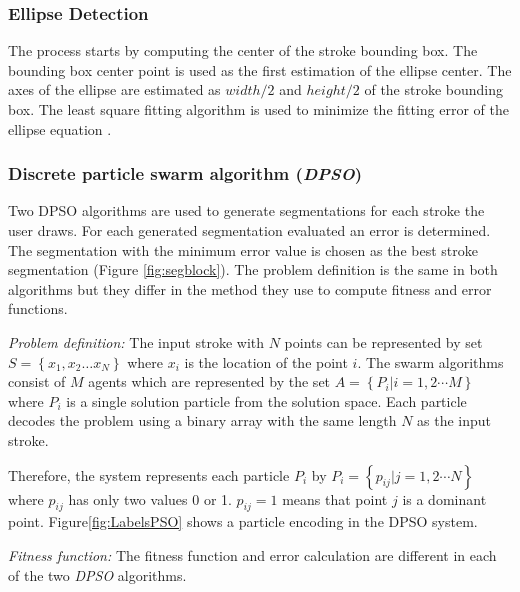 \documentclass{article}
\begin{document}
\subsubsection{Ellipse Detection} 
The process starts by computing the center of the stroke bounding box. The bounding box center point is used as the first estimation of the ellipse center. The axes of the ellipse are estimated as $width/2$ and $height/2$ of the stroke bounding box. The least square fitting algorithm is used to minimize the fitting error of the ellipse equation \cite{chernov}.  
\subsubsection{Discrete particle swarm algorithm (\textit{DPSO})}
\label{subsubsec:Discreteparticleswarmalgorithm}
Two DPSO algorithms are used to generate segmentations for each stroke the user draws. For each generated segmentation evaluated an error is determined. The segmentation with the minimum error value is chosen as the best stroke segmentation (Figure \ref{fig:segblock}). The problem definition is the same in both algorithms but they differ in the method they use to compute fitness and error functions. 

\textsl{Problem definition:} The input stroke with $N$ points can be represented by set $S = \left\{ {x_1 ,x_2  \ldots x_N }\right\}$ where $x_i$ is the location of the point $i$. The swarm algorithms consist of $M$ agents which are represented by the set  $A = \left\{ {P_i \left| {i = 1,2 \cdots M} \right.} \right\}$ where $P_i$ is a single solution particle from the solution space. Each particle decodes the problem using a binary array with the same length $N$ as the input stroke.  

Therefore, the system represents each particle $P_i$ by $P_i = \left\{ {p_{ij} \left| {j = 1,2 \cdots N} \right.} \right\}$ where $p_{ij}$ has only two values 0 or 1. $p_{ij}=1$ means that point $j$ is a dominant point. Figure\ref{fig:LabelsPSO} shows a particle encoding in the DPSO system. 

\textsl{Fitness function:} The fitness function and error calculation are different in each of the two \textit{DPSO} algorithms. 
\end{document}
